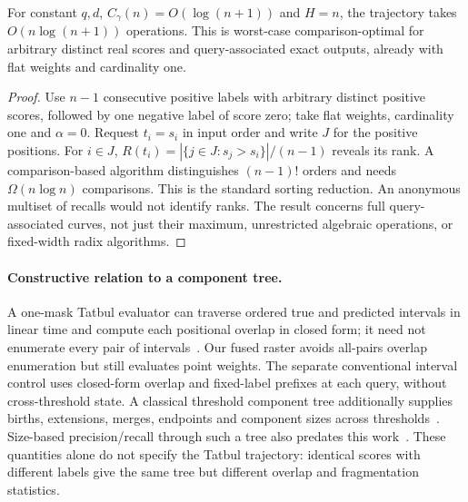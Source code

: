 \begin{corollary}
For constant $q,d$, $C_\gamma(n)=O(\log(n+1))$ and $H=n$, the trajectory takes
$O(n\log(n+1))$ operations. This is worst-case comparison-optimal for
arbitrary distinct real scores and query-associated exact outputs, already
with flat weights and cardinality one.
\end{corollary}
\begin{proof}
Use $n-1$ consecutive positive labels with arbitrary distinct positive scores,
followed by one negative label of score zero; take flat weights, cardinality
one and $\alpha=0$. Request $t_i=s_i$ in input order and write $J$ for the
positive positions. For $i\in J$,
$R(t_i)=|\{j\in J:s_j>s_i\}|/(n-1)$ reveals its rank. A comparison-based
algorithm distinguishes $(n-1)!$ orders and needs $\Omega(n\log n)$ comparisons.
This is the standard sorting reduction. An anonymous multiset of recalls
would not identify ranks. The result concerns full query-associated curves,
not just their maximum, unrestricted algebraic operations, or fixed-width
radix algorithms.
\end{proof}

\paragraph{Constructive relation to a component tree.}
A one-mask Tatbul evaluator can traverse ordered true and predicted intervals
in linear time and compute each positional overlap in closed form; it need
not enumerate every pair of intervals~\cite{tatbul2018}. Our fused raster
avoids all-pairs overlap enumeration but still evaluates point weights. The
separate conventional interval control uses closed-form overlap and fixed-label
prefixes at each query, without cross-threshold state. A classical
threshold component tree additionally supplies births, extensions, merges,
endpoints and component sizes across thresholds~\cite{najman2006,menotti2007}.
Size-based precision/recall through such a tree also predates this
work~\cite{ranefall2016}. These quantities alone do not specify the Tatbul
trajectory: identical scores with different labels give the same tree but
different overlap and fragmentation statistics.


